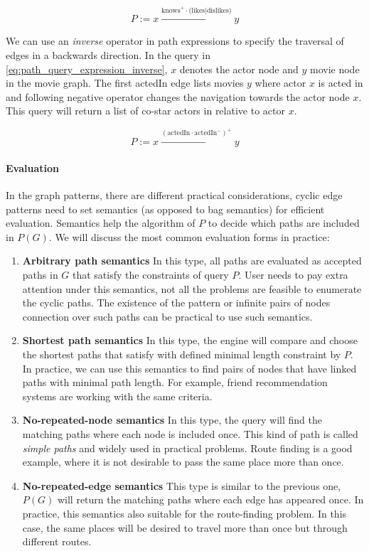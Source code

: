 \begin{equation}\label{eq:path_query_expression}
P := x \xrightarrow{\text{knows}^+\cdot\text{(likes|dislikes)}} y
\end{equation} 

We can use an \textit{inverse} operator in path expressions to specify the traversal of edges in a backwards direction.
In the query in \autoref{eq:path_query_expression_inverse}, $x$ denotes the actor node and $y$ movie node in the movie graph.
The first \textsf{actedIn} edge lists movies $y$ where actor $x$ is acted in and following negative operator changes the navigation towards the actor node $x$.
This query will return a list of co-star actors in relative to actor $x$.

\begin{equation}\label{eq:path_query_expression_inverse}
P := x \xrightarrow{(\text{actedIn}\cdot\text{actedIn}^-)^+} y
\end{equation} 

\paragraph{Evaluation}

In the graph patterns, there are different practical considerations, \eg cyclic edge patterns need to set semantics (as opposed to bag semantics) for efficient evaluation.
Semantics help the algorithm of $P$ to decide which paths are included in $P(G)$.
We will discuss the most common evaluation forms in practice:

\begin{enumerate}
  \item \textbf{Arbitrary path semantics}
  In this type, all paths are evaluated as accepted paths in $G$ that satisfy the constraints of query $P$.
  User needs to pay extra attention under this semantics, not all the problems are feasible to enumerate the cyclic paths.
  The existence of the pattern or infinite pairs of nodes connection over such paths can be practical to use such semantics.
  \item \textbf{Shortest path semantics}
  In this type, the engine will compare and choose the shortest paths that satisfy with defined minimal length constraint by $P$.
  In practice, we can use this semantics to find pairs of nodes that have linked paths with minimal path length.
  For example, friend recommendation systems are working with the same criteria.
  \item \textbf{No-repeated-node semantics}
  In this type, the query will find the matching paths where each node is included once.
  This kind of path is called \textit{simple paths} and widely used in practical problems.
  Route finding is a good example, where it is not desirable to pass the same place more than once.
  \item \textbf{No-repeated-edge semantics}
  This type is similar to the previous one, $P(G)$ will return the matching paths where each edge has appeared once.
  In practice, this semantics also suitable for the route-finding problem.
  In this case, the same places will be desired to travel more than once but through different routes.
\end{enumerate}


